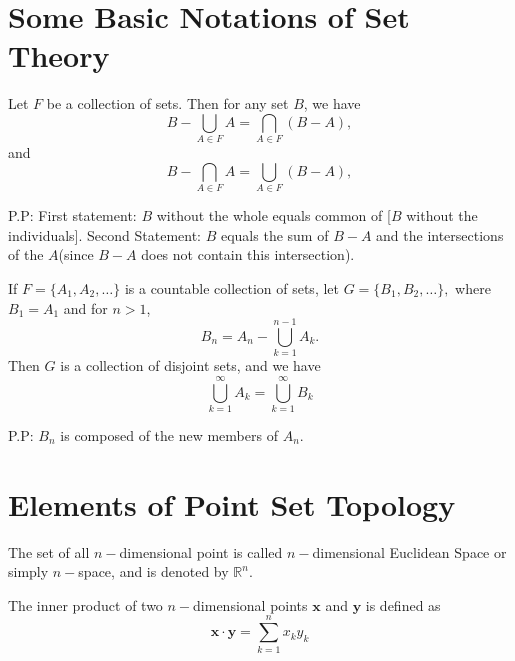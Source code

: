 \documentclass[10pt,a4paper]{book}
\begin{document}
\chapter{Some Basic Notations of Set Theory}
\begin{Thm}
	Let $F$ be a collection of sets. Then for any set $B$, we have 
		$$B - \bigcup_{A \in F} A =  \bigcap_{A \in F} (B - A),$$
		and
		$$B - \bigcap_{A \in F} A =  \bigcup_{A \in F} (B - A),$$
\end{Thm}
P.P: First statement: $B$ without the whole equals common of [$B$ without the individuals]. Second Statement:  $B$ equals the sum of $B-A$ and the intersections of the $A$(since $B-A$ does not contain this intersection).
\begin{Thm}
	If $F = \{A_1, A_2, \dots\}$ is a countable collection of sets, let $G = \{B_1, B_2, \dots \},$ where $B_1 = A_1$ and for $n>1$,
	$$B_n =  A_n - \bigcup_{k=1}^{n-1} A_k.$$
	Then $G$ is a collection of disjoint sets, and we have 
		$$\bigcup_{k=1}^{\infty} A_k = \bigcup_{k=1}^{\infty} B_k$$
\end{Thm}
\noindent P.P: $B_n$ is composed of the new members of $A_n$. 
\chapter{Elements of Point Set Topology}
\begin{deff}
	The set of all $n-$dimensional point is called $n-$dimensional Euclidean Space or simply $n-$space, and is denoted by $\mathbb{R}^n$. 
\end{deff}
\begin{deff}
The inner product of two $n-$dimensional points $\mathbf{x}$ and $\mathbf{y}$ is defined as
$$\mathbf{x}\cdot\mathbf{y} = \sum_{k=1}^{n}x_ky_k$$
\end{deff}
\end{document}
